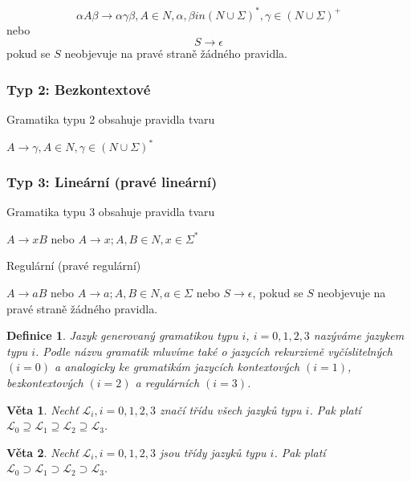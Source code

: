 \documentclass[a4paper, 11pt]{report}
\newtheorem{mydef}{Definice}[chapter]
\newtheorem{veta}{Věta}[chapter]
\begin{document}
$$ \alpha A \beta \to \alpha \gamma \beta, A \in N, \alpha, \beta in (N \cup \Sigma)^*, \gamma \in (N \cup \Sigma)^+$$
nebo 
$$S \to \epsilon$$
pokud se $S$ neobjevuje na pravé straně žádného pravidla.

\subsubsection{Typ 2: Bezkontextové}
Gramatika typu 2 obsahuje pravidla tvaru

$A \to \gamma, A \in N, \gamma \in (N \cup \Sigma)^*$

\subsubsection{Typ 3: Lineární (pravé lineární)}
Gramatika typu 3 obsahuje pravidla tvaru

$A \to xB$ nebo $A \to x; A, B \in N, x \in \Sigma^*$

Regulární (pravé regulární)

$A \to aB$ nebo $A \to a; A, B \in N, a \in \Sigma$ nebo $S \to \epsilon$, pokud se $S$ neobjevuje na pravé straně žádného pravidla.


\begin{mydef}
Jazyk generovaný gramatikou typu $i$, $i = 0, 1, 2, 3$ nazýváme jazykem typu $i$. Podle názvu gramatik mluvíme také o jazycích \emph{rekurzivně vyčíslitelných $(i=0)$} a analogicky ke gramatikám jazycích \emph{kontextových $(i=1)$}, \emph{bezkontextových $(i=2)$} a \emph{regulárních $(i=3)$}.
\end{mydef}

\begin{veta}
Nechť $\mathcal{L}_i, i = 0, 1, 2, 3$ značí třídu všech jazyků typu $i$. Pak platí $\mathcal{L}_0 \supseteq \mathcal{L}_1 \supseteq \mathcal{L}_2 \supseteq \mathcal{L}_3$.
\end{veta}

\begin{veta}
Nechť $\mathcal{L}_i, i = 0, 1, 2, 3$ jsou třídy jazyků typu $i$. Pak platí $\mathcal{L}_0 \supset \mathcal{L}_1 \supset \mathcal{L}_2 \supset \mathcal{L}_3$.
\end{veta}












\end{document}
